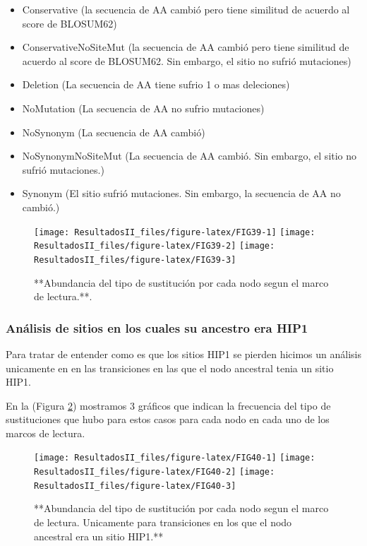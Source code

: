 \documentclass[
]{book}
\providecommand{\tightlist}{%
  \setlength{\itemsep}{0pt}\setlength{\parskip}{0pt}}
\begin{document}
\begin{itemize}
\tightlist
\item
  Conservative (la secuencia de AA cambió pero tiene similitud de acuerdo al score de BLOSUM62)
\item
  ConservativeNoSiteMut (la secuencia de AA cambió pero tiene similitud de acuerdo al score de BLOSUM62. Sin embargo, el sitio no sufrió mutaciones)
\item
  Deletion (La secuencia de AA tiene sufrio 1 o mas deleciones)
\item
  NoMutation (La secuencia de AA no sufrio mutaciones)
\item
  NoSynonym (La secuencia de AA cambió)
\item
  NoSynonymNoSiteMut (La secuencia de AA cambió. Sin embargo, el sitio no sufrió mutaciones.)
\item
  Synonym (El sitio sufrió mutaciones. Sin embargo, la secuencia de AA no cambió.)
\end{itemize}

\begin{figure}

{\centering \texttt{[image: ResultadosII\_files/figure-latex/FIG39-1]} \texttt{[image: ResultadosII\_files/figure-latex/FIG39-2]} \texttt{[image: ResultadosII\_files/figure-latex/FIG39-3]} 

}

\caption{**Abundancia del tipo de sustitución por cada nodo segun el marco de lectura.**.}\label{fig:FIG39}
\end{figure}

\hypertarget{anuxe1lisis-de-sitios-en-los-cuales-su-ancestro-era-hip1-3}{%
\subsubsection{Análisis de sitios en los cuales su ancestro era HIP1}\label{anuxe1lisis-de-sitios-en-los-cuales-su-ancestro-era-hip1-3}}

Para tratar de entender como es que los sitios HIP1 se pierden hicimos un análisis unicamente en en las transiciones en las que el nodo ancestral tenia un sitio HIP1.

En la (Figura \ref{fig:FIG40}) mostramos 3 gráficos que indican la frecuencia del tipo de sustituciones que hubo para estos casos para cada nodo en cada uno de los marcos de lectura.

\begin{figure}

{\centering \texttt{[image: ResultadosII\_files/figure-latex/FIG40-1]} \texttt{[image: ResultadosII\_files/figure-latex/FIG40-2]} \texttt{[image: ResultadosII\_files/figure-latex/FIG40-3]} 

}

\caption{**Abundancia del tipo de sustitución por cada nodo segun el marco de lectura. Unicamente para transiciones en los que el nodo ancestral era un sitio HIP1.**}\label{fig:FIG40}
\end{figure}
\end{document}
